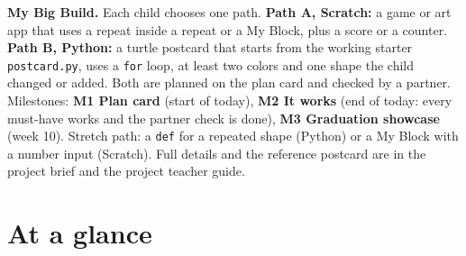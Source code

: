 \begin{teachernote}
\textbf{My Big Build.} Each child chooses one path. \textbf{Path A, Scratch:} a game or art app that uses a repeat inside a repeat or a My Block, plus a score or a counter. \textbf{Path B, Python:} a turtle postcard that starts from the working starter \texttt{postcard.py}, uses a \texttt{for} loop, at least two colors and one shape the child changed or added. Both are planned on the plan card and checked by a partner. Milestones: \textbf{M1 Plan card} (start of today), \textbf{M2 It works} (end of today: every must-have works and the partner check is done), \textbf{M3 Graduation showcase} (week 10). Stretch path: a \texttt{def} for a repeated shape (Python) or a My Block with a number input (Scratch). Full details and the reference postcard are in the project brief and the project teacher guide.
\end{teachernote}

\section{At a glance}
\begin{timeplan}
\end{timeplan}

